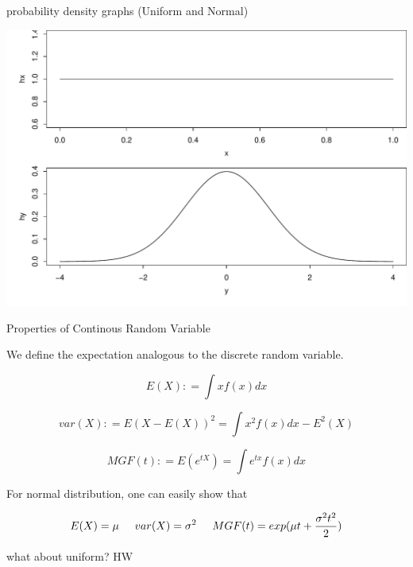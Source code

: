 \documentclass{beamer}\usepackage[]{graphicx}\usepackage[]{color}
\newenvironment{knitrout}{}{} %
\renewenvironment{knitrout}{\begin{spacing}{0.75}\begin{tiny}}{\end{tiny}\end{spacing}}
\begin{document}
\begin{frame}{probability density graphs (Uniform and Normal)}

\begin{knitrout}\small
{}\color{fgcolor}

{\centering \includegraphics[width=0.99\linewidth]{figure/graphics-unnamed-chunk-5-1} 

}



\end{knitrout}

\end{frame}

\begin{frame}{Properties of Continous Random Variable}

We define the expectation analogous to the discrete random variable.

$$ E(X): = \int x f(x) dx $$

$$ var(X) : = E(X-E(X))^2 = \int x^2 f(x) dx - E^2(X) $$

$$ MGF(t): = E(e^{tX}) = \int e^{tx} f(x) dx $$

For normal distribution, one can easily show that

$$ E(X) = \mu \hspace{0.5 cm} var(X)=\sigma^2 \hspace{0.5 cm} MGF(t) = exp(\mu t + \frac{\sigma^2t^2}{2}) $$

what about uniform? HW

\end{frame}
\end{document}
